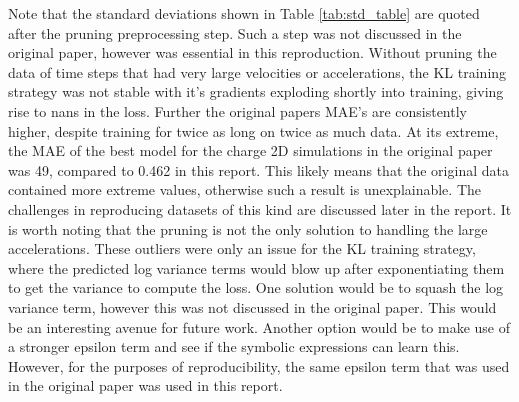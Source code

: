 \documentclass[11pt]{article}
\begin{document}
    Note that the standard deviations shown in Table \ref{tab:std_table} are quoted after the pruning preprocessing step. Such a step was not discussed in the original paper, however was essential in this reproduction. Without pruning the data of time steps that had very large velocities or accelerations, the KL training strategy was not stable with it's gradients exploding shortly into training, giving rise to nans in the loss. Further the original papers MAE's are consistently higher, despite training for twice as long on twice as much data. At its extreme, the MAE of the best model for the charge 2D simulations in the original paper was 49, compared to 0.462 in this report. This likely means that the original data contained more extreme values, otherwise such a result is unexplainable. The challenges in reproducing datasets of this kind are discussed later in the report. It is worth noting that the pruning is not the only solution to handling the large accelerations. These outliers were only an issue for the KL training strategy, where the predicted log variance terms would blow up after exponentiating them to get the variance to compute the loss. One solution would be to squash the log variance term, however this was not discussed in the original paper. This would be an interesting avenue for future work. Another option would be to make use of a stronger epsilon term and see if the symbolic expressions can learn this. However, for the purposes of reproducibility, the same epsilon term that was used in the original paper was used in this report.


    

\end{document}
